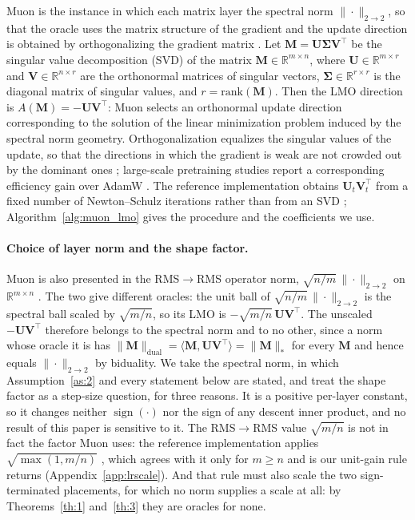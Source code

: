 Muon is the instance in which each matrix layer  the spectral norm $\|\cdot\|_{2\to2}$, so that the oracle uses the matrix structure of the gradient and the update direction is obtained by orthogonalizing the gradient matrix \cite{bernstein2024old}. Let $\mathbf{M}=\mathbf{U}\boldsymbol{\Sigma}\mathbf{V}^\top$ be the singular value decomposition (SVD) of the matrix $\mathbf{M}\in\mathbb{R}^{m\times n}$, where $\mathbf{U}\in\mathbb{R}^{m\times r}$ and $\mathbf{V}\in\mathbb{R}^{n\times r}$ are the orthonormal matrices of singular vectors, $\boldsymbol{\Sigma}\in\mathbb{R}^{r\times r}$ is the diagonal matrix of singular values, and $r=\mathrm{rank}(\mathbf{M})$. Then the LMO direction is $A(\mathbf{M})=-\mathbf{U}\mathbf{V}^\top$: Muon selects an orthonormal update direction corresponding to the solution of the linear minimization problem induced by the spectral norm geometry. Orthogonalization equalizes the singular values of the update, so that the directions in which the gradient is weak are not crowded out by the dominant ones \citep{jordan2024muon}; large-scale pretraining studies report a corresponding efficiency gain over AdamW \citep{liu2025muon,shah2025practical}. The reference implementation obtains $\mathbf{U}_t\mathbf{V}_t^\top$ from a fixed number of Newton--Schulz iterations rather than from an SVD \citep{jordan2024muon}; Algorithm~\ref{alg:muon_lmo} gives the procedure and the coefficients we use.

\paragraph{Choice of layer norm and the shape factor.} Muon is also presented in the RMS$\to$RMS operator norm, $\sqrt{n/m}\,\|\cdot\|_{2\to2}$ on $\mathbb{R}^{m\times n}$ \citep{bernstein2024old,pethick2025training}. The two  give different oracles: the unit ball of $\sqrt{n/m}\,\|\cdot\|_{2\to2}$ is the spectral ball scaled by $\sqrt{m/n}$, so its LMO is $-\sqrt{m/n}\,\mathbf{U}\mathbf{V}^\top$. The unscaled $-\mathbf{U}\mathbf{V}^\top$ therefore belongs to the spectral norm and to no other, since a norm whose oracle it is has $\|\mathbf{M}\|_{\mathrm{dual}}=\langle\mathbf{M},\mathbf{U}\mathbf{V}^\top\rangle=\|\mathbf{M}\|_{*}$ for every $\mathbf{M}$ and hence equals $\|\cdot\|_{2\to2}$ by biduality. We take the spectral norm, in which Assumption~\ref{as:2} and every statement below are stated, and treat the shape factor as a step-size question, for three reasons. It is a positive per-layer constant, so it changes neither $\operatorname{sign}(\cdot)$ nor the sign of any descent inner product, and no result of this paper is sensitive to it. The RMS$\to$RMS value $\sqrt{m/n}$ is not in fact the factor Muon uses: the reference implementation applies $\sqrt{\max(1,m/n)}$ \citep{jordan2024muon}, which agrees with it only for $m\ge n$ and is  our unit-gain rule returns (Appendix~\ref{app:lrscale}). And that rule must also scale the two sign-terminated placements, for which no norm supplies a scale at all: by Theorems~\ref{th:1} and~\ref{th:3} they are oracles for none.

